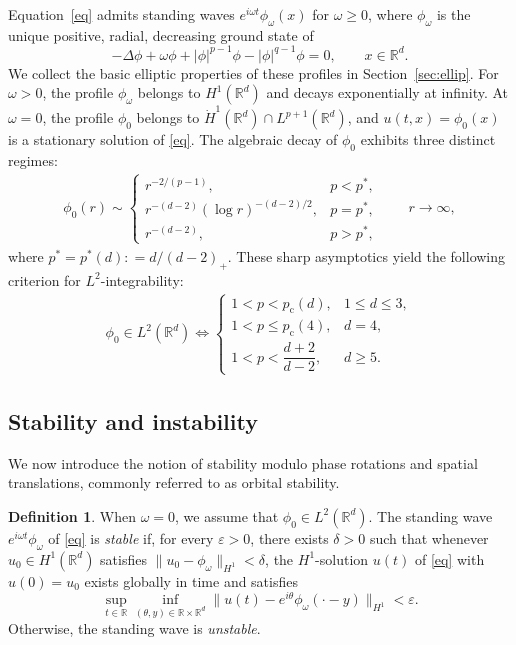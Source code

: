\documentclass[12pt, a4paper, reqno]{amsart}
\numberwithin{equation}{section}
\theoremstyle{definition}
\newtheorem*{definition*}{Definition}
\theoremstyle{remark}
\newcommand{\R}{\mathbb R}
\newcommand{\eps}{\varepsilon}
\newcommand{\ce}{\mathrel{\mathop:}=}
\begin{document}
Equation~\eqref{eq} admits standing waves $e^{i\omega t}\phi_\omega(x)$
for $\omega\ge0$, where $\phi_\omega$ is the unique positive, radial,
decreasing ground state of
\begin{equation}\label{eq:spomega}
  -\Delta\phi+\omega\phi+|\phi|^{p-1}\phi-|\phi|^{q-1}\phi=0,
  \qquad x\in\R^d.
\end{equation}
We collect the basic elliptic properties of these profiles in Section~\ref{sec:ellip}.
For $\omega>0$, the profile $\phi_\omega$ belongs to $H^1(\R^d)$ and decays exponentially at infinity. At $\omega=0$, the profile $\phi_0$ belongs to $\dot H^1(\R^d)\cap L^{p+1}(\R^d)$, and $u(t,x)=\phi_0(x)$ is a stationary solution of \eqref{eq}. The algebraic decay of $\phi_0$ exhibits three distinct regimes:
\begin{align}
\label{decay}
  \phi_0(r)\sim
  \begin{cases}
    r^{-2/(p-1)}, & p<p^*,\\[2pt]
    r^{-(d-2)}(\log r)^{-(d-2)/2}, & p=p^*,\\[2pt]
    r^{-(d-2)}, & p>p^*,
  \end{cases}
  \qquad r\to\infty,
\end{align}
where $p^*=p^*(d)\ce d/(d-2)_+$.
These sharp asymptotics yield the following criterion for $L^2$-integrability:
\begin{align}
\label{l2}
  \phi_0\in L^2(\R^d)
  \iff
  \begin{cases}
    1<p<p_{\mathrm c}(d), & 1\le d\le3,\\
    1<p\le p_{\mathrm c}(4), & d=4,\\
    1<p<\dfrac{d+2}{d-2}, & d\ge5.
  \end{cases}
\end{align}

\subsection{Stability and instability}
We now introduce the notion of stability modulo phase rotations and spatial translations, commonly referred to as orbital stability.
\begin{definition*}
When $\omega=0$, we assume that $\phi_0\in L^2(\R^d)$.
The standing wave $e^{i\omega t}\phi_\omega$ of \eqref{eq}
is \emph{stable} if, for every $\eps>0$, there exists $\delta>0$
such that whenever $u_0\in H^1(\R^d)$ satisfies
$\|u_0-\phi_\omega\|_{H^1}<\delta$,
the $H^1$-solution $u(t)$ of \eqref{eq} with $u(0)=u_0$
exists globally in time and satisfies
\[
   \sup_{t\in\R}\inf_{(\theta,y)\in\R\times\R^d}
 \|u(t)-e^{i\theta}\phi_\omega(\cdot-y)\|_{H^1}<\eps.
\]
Otherwise, the standing wave is \emph{unstable}.
\end{definition*}
\end{document}
